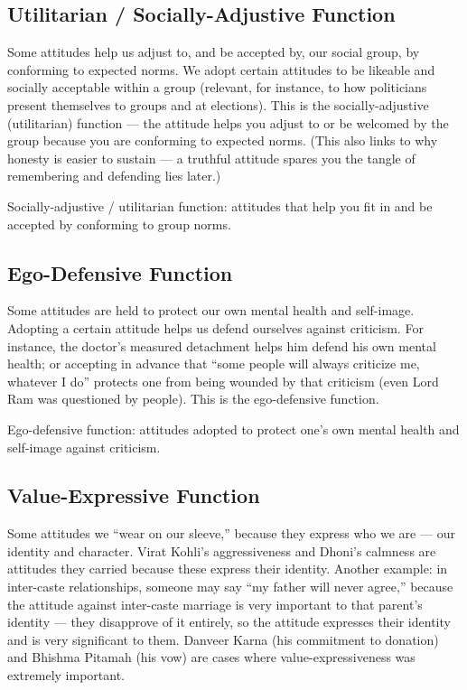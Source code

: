 \subsection{Utilitarian / Socially-Adjustive Function}

Some attitudes help us adjust to, and be accepted by, our social group, by conforming to expected norms. We adopt certain attitudes to be likeable and socially acceptable within a group (relevant, for instance, to how politicians present themselves to groups and at elections). This is the socially-adjustive (utilitarian) function --- the attitude helps you adjust to or be welcomed by the group because you are conforming to expected norms. (This also links to why honesty is easier to sustain --- a truthful attitude spares you the tangle of remembering and defending lies later.)

\begin{KeyConcept}
Socially-adjustive / utilitarian function: attitudes that help you fit in and be accepted by conforming to group norms.
\end{KeyConcept}

\subsection{Ego-Defensive Function}

Some attitudes are held to protect our own mental health and self-image. Adopting a certain attitude helps us defend ourselves against criticism. For instance, the doctor's measured detachment helps him defend his own mental health; or accepting in advance that ``some people will always criticize me, whatever I do'' protects one from being wounded by that criticism (even Lord Ram was questioned by people). This is the ego-defensive function.

\begin{KeyConcept}
Ego-defensive function: attitudes adopted to protect one's own mental health and self-image against criticism.
\end{KeyConcept}

\subsection{Value-Expressive Function}

Some attitudes we ``wear on our sleeve,'' because they express who we are --- our identity and character. Virat Kohli's aggressiveness and Dhoni's calmness are attitudes they carried because these express their identity. Another example: in inter-caste relationships, someone may say ``my father will never agree,'' because the attitude against inter-caste marriage is very important to that parent's identity --- they disapprove of it entirely, so the attitude expresses their identity and is very significant to them. Danveer Karna (his commitment to donation) and Bhishma Pitamah (his vow) are cases where value-expressiveness was extremely important.

